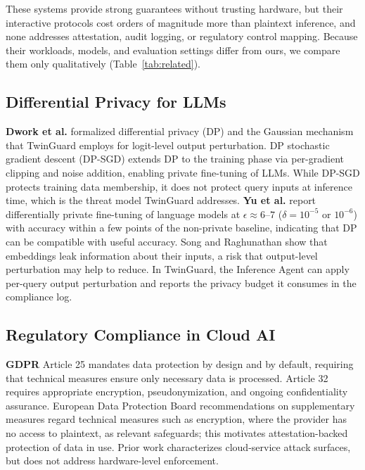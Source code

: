 \documentclass{ieeeaccess}
\begin{document}
These systems provide strong guarantees without trusting hardware, but their
interactive protocols cost orders of magnitude more than plaintext inference,
and none addresses attestation, audit logging, or regulatory control mapping.
Because their workloads, models, and evaluation settings differ from ours,
we compare them only qualitatively (Table~\ref{tab:related}).

\subsection{Differential Privacy for LLMs}

\textbf{Dwork et al.} \cite{dwork2014algorithmic} formalized differential privacy (DP) and the Gaussian mechanism that TwinGuard employs for logit-level
output perturbation. DP stochastic gradient descent (DP-SGD) \cite{abadi2016deep} extends DP to the training
phase via per-gradient clipping and noise addition, enabling private
fine-tuning of LLMs. While DP-SGD protects training data membership,
it does not protect query inputs at inference time, which is the threat model
TwinGuard addresses. \textbf{Yu et al.} \cite{yu2022differentially} report differentially private fine-tuning of
language models at $\epsilon \approx 6$--$7$ ($\delta = 10^{-5}$ or
$10^{-6}$) with accuracy within a few points of the non-private baseline,
indicating that DP can be compatible with useful accuracy. Song and
Raghunathan \cite{song2020information} show that embeddings leak information
about their inputs, a risk that output-level perturbation may help to reduce.
In TwinGuard, the Inference Agent can apply per-query output perturbation and
reports the privacy budget it consumes in the compliance log.

\subsection{Regulatory Compliance in Cloud AI}

\textbf{GDPR} \cite{gdpr2016} Article 25 mandates data protection by design
and by default, requiring that technical measures ensure only necessary data
is processed. Article 32 requires appropriate encryption, pseudonymization,
and ongoing confidentiality assurance. European Data Protection Board
recommendations on supplementary measures \cite{edpb2021} regard technical
measures such as encryption, where the provider has no access to plaintext, as
relevant safeguards; this motivates attestation-backed protection of data in use. Prior work \cite{gruschka2010privacy}
characterizes cloud-service attack surfaces, but does not address
hardware-level enforcement.
\end{document}
